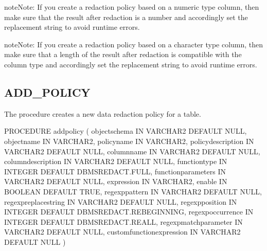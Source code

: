 \documentclass[letterpaper,10pt,english,openany,oneside]{sphinxmanual}
\begin{document}
\begin{sphinxadmonition}{note}{Note:}
If you create a redaction policy based on a numeric type column, then make sure that the result after redaction is a number and accordingly set the replacement string to avoid runtime errors.
\end{sphinxadmonition}

\begin{sphinxadmonition}{note}{Note:}
If you create a redaction policy based on a character type column, then make sure that a length of the result after redaction is compatible with the column type and accordingly set the replacement string to avoid runtime errors.
\end{sphinxadmonition}

\newpage

\ignorespaces 

\subsection{ADD\_POLICY}
\label{\detokenize{dbms_redact:add-policy}}\label{\detokenize{dbms_redact:index-2}}
The  procedure creates a new data redaction policy for a
table.

%
\begin{sphinxVerbatim}[commandchars=\\\{\}]
PROCEDURE add\PYGZus{}policy (
object\PYGZus{}schema                     IN VARCHAR2 DEFAULT NULL,
object\PYGZus{}name                       IN VARCHAR2,
policy\PYGZus{}name                       IN VARCHAR2,
policy\PYGZus{}description                IN VARCHAR2 DEFAULT NULL,
column\PYGZus{}name                       IN VARCHAR2 DEFAULT NULL,
column\PYGZus{}description                IN VARCHAR2 DEFAULT NULL,
function\PYGZus{}type             IN INTEGER DEFAULT DBMS\PYGZus{}REDACT.FULL,
function\PYGZus{}parameters               IN VARCHAR2 DEFAULT NULL,
expression                        IN VARCHAR2,
enable                            IN BOOLEAN DEFAULT TRUE,
regexp\PYGZus{}pattern                    IN VARCHAR2 DEFAULT NULL,
regexp\PYGZus{}replace\PYGZus{}string             IN VARCHAR2 DEFAULT NULL,
regexp\PYGZus{}position    IN INTEGER DEFAULT DBMS\PYGZus{}REDACT.RE\PYGZus{}BEGINNING,
regexp\PYGZus{}occurrence IN INTEGER DEFAULT       DBMS\PYGZus{}REDACT.RE\PYGZus{}ALL,
regexp\PYGZus{}match\PYGZus{}parameter            IN VARCHAR2 DEFAULT NULL,
custom\PYGZus{}function\PYGZus{}expression        IN VARCHAR2 DEFAULT NULL
)
\end{sphinxVerbatim}
\end{document}
